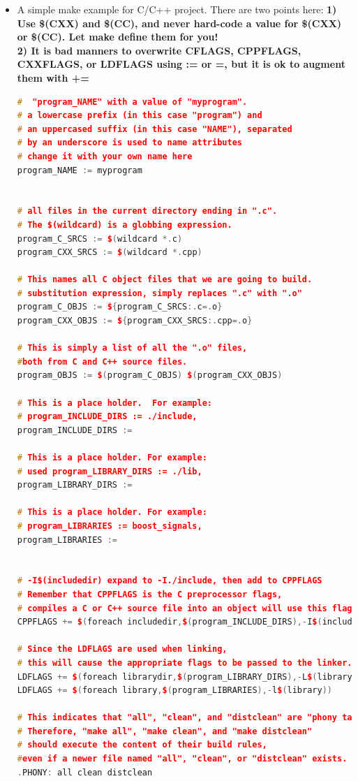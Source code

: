 \documentclass[a4paper,11pt,twoside]{book}
\begin{document}
\begin{itemize}
	\item A simple make example for C/C++ project. There are two points here: \textbf{1) Use \$(CXX) and \$(CC), and never hard-code a value for \$(CXX) or \$(CC). Let make define them for you! } \\

\textbf{2) It is bad manners to overwrite CFLAGS, CPPFLAGS, CXXFLAGS, or LDFLAGS using := or =, but it is ok to augment them with += }

\begin{lstlisting}[frame=single,  basicstyle=\small, language=c++, mathescape=false]
#  "program_NAME" with a value of "myprogram". 
# a lowercase prefix (in this case "program") and 
# an uppercased suffix (in this case "NAME"), separated
# by an underscore is used to name attributes
# change it with your own name here 
program_NAME := myprogram


# all files in the current directory ending in ".c". 
# The $(wildcard) is a globbing expression. 
program_C_SRCS := $(wildcard *.c)
program_CXX_SRCS := $(wildcard *.cpp)

# This names all C object files that we are going to build. 
# substitution expression, simply replaces ".c" with ".o"
program_C_OBJS := ${program_C_SRCS:.c=.o}
program_CXX_OBJS := ${program_CXX_SRCS:.cpp=.o}

# This is simply a list of all the ".o" files, 
#both from C and C++ source files.
program_OBJS := $(program_C_OBJS) $(program_CXX_OBJS)

# This is a place holder.  For example:
# program_INCLUDE_DIRS := ./include, 
program_INCLUDE_DIRS :=

# This is a place holder. For example:
# used program_LIBRARY_DIRS := ./lib, 
program_LIBRARY_DIRS :=

# This is a place holder. For example:
# program_LIBRARIES := boost_signals, 
program_LIBRARIES :=


# -I$(includedir) expand to -I./include, then add to CPPFLAGS
# Remember that CPPFLAGS is the C preprocessor flags, 
# compiles a C or C++ source file into an object will use this flag.
CPPFLAGS += $(foreach includedir,$(program_INCLUDE_DIRS),-I$(includedir))

# Since the LDFLAGS are used when linking, 
# this will cause the appropriate flags to be passed to the linker.
LDFLAGS += $(foreach librarydir,$(program_LIBRARY_DIRS),-L$(librarydir))
LDFLAGS += $(foreach library,$(program_LIBRARIES),-l$(library))

# This indicates that "all", "clean", and "distclean" are "phony targets". 
# Therefore, "make all", "make clean", and "make distclean"
# should execute the content of their build rules, 
#even if a newer file named "all", "clean", or "distclean" exists.
.PHONY: all clean distclean



\end{lstlisting}
\end{itemize}
\end{document}
